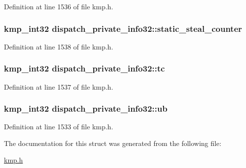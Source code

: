 Definition at line 1536 of file kmp.\-h.

\hypertarget{structdispatch__private__info32_a10071a978613d4d659ce187d74e2c8fc}{
\subsubsection[{static\-\_\-steal\-\_\-counter}]{\setlength{\rightskip}{0pt plus 5cm}kmp\-\_\-int32 dispatch\-\_\-private\-\_\-info32\-::static\-\_\-steal\-\_\-counter}}\label{structdispatch__private__info32_a10071a978613d4d659ce187d74e2c8fc}


Definition at line 1538 of file kmp.\-h.

\hypertarget{structdispatch__private__info32_a406e796c32b90d31e576b523049f8557}{
\subsubsection[{tc}]{\setlength{\rightskip}{0pt plus 5cm}kmp\-\_\-int32 dispatch\-\_\-private\-\_\-info32\-::tc}}\label{structdispatch__private__info32_a406e796c32b90d31e576b523049f8557}


Definition at line 1537 of file kmp.\-h.

\hypertarget{structdispatch__private__info32_a2f5539b2d4b0802837e6b4efcf40e339}{
\subsubsection[{ub}]{\setlength{\rightskip}{0pt plus 5cm}kmp\-\_\-int32 dispatch\-\_\-private\-\_\-info32\-::ub}}\label{structdispatch__private__info32_a2f5539b2d4b0802837e6b4efcf40e339}


Definition at line 1533 of file kmp.\-h.



The documentation for this struct was generated from the following file\-:\begin{DoxyCompactItemize}
\item 
\hyperlink{kmp_8h}{kmp.\-h}\end{DoxyCompactItemize}
